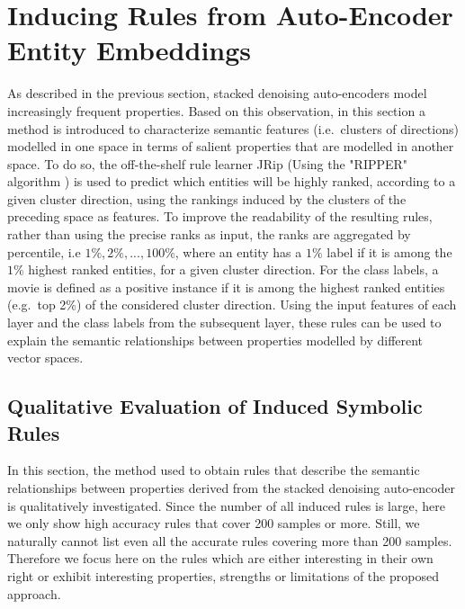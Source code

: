 \section{Inducing Rules from Auto-Encoder Entity Embeddings}\label{InducingRulesFromEntityEmbeddings}

As described in the previous section, stacked denoising auto-encoders model increasingly frequent properties. Based on this observation, in this section a method is introduced  to characterize semantic features (i.e.\ clusters of directions)  modelled in one space  in terms of salient properties that are modelled in another space. To do so, the off-the-shelf rule learner JRip (Using the "RIPPER" algorithm \cite{Cohen1995})  is used to predict which entities will be highly ranked, according to a given cluster direction, using the rankings induced by the clusters of the preceding space   as features. To improve the readability of the resulting rules, rather than using the precise ranks as input, the ranks are aggregated by percentile, i.e $1\%, 2\%, ..., 100\%$, where an entity has a $1\%$ label if it is among the $1\%$ highest ranked entities, for a given cluster direction. For the class labels,  a movie is defined as a positive instance if it is among the highest ranked entities (e.g.\ top 2\%) of the considered cluster direction. Using the input features of each layer and the class labels  from the subsequent layer, these rules can be used to explain the semantic relationships between properties modelled by different vector spaces. 


\subsection{Qualitative Evaluation of Induced Symbolic Rules}

In this section, the method used to obtain rules that describe the semantic relationships between properties derived from the stacked denoising auto-encoder is qualitatively investigated. Since the number of all induced rules is large, here we only show high accuracy rules that cover 200 samples or more.  Still, we naturally cannot list even all the accurate rules covering more than 200 samples. Therefore we focus here on the rules which are either interesting in their own right or exhibit interesting properties, strengths or limitations of the proposed approach. 

